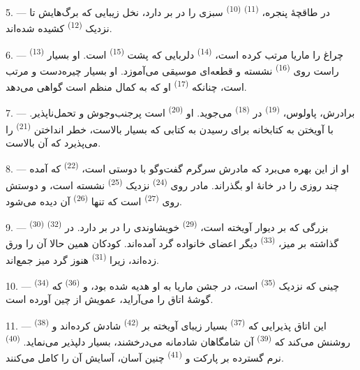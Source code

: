 5. --- در طاقچهٔ پنجره،  \textsuperscript{(11)}
 \textsuperscript{(10)} سبزی را در بر دارد، نخل زیبایی که
برگ‌هایش تا نزدیک  \textsuperscript{(12)} کشیده
شده‌اند.

6. ---  \textsuperscript{(13)} چراغ را ماریا مرتب کرده
است،  \textsuperscript{(14)} دلربایی که پشت
 \textsuperscript{(15)} است. او بسیار راست روی
 \textsuperscript{(16)} نشسته و قطعه‌ای موسیقی
می‌آموزد. او بسیار چیره‌دست و مرتب است، چنانکه 
\textsuperscript{(17)} او که به کمال منظم است گواهی می‌دهد.

\VUsaut{5.0mm}
\VUsaut{3.0mm}

7. --- برادرش، پاولوس،  \textsuperscript{(19)} در
 \textsuperscript{(18)} می‌جوید. او 
\textsuperscript{(20)} است پرجنب‌وجوش و تحمل‌ناپذیر. با آویختن به
کتابخانه برای رسیدن به کتابی که بسیار بالاست، خطر انداختن
 \textsuperscript{(21)} را می‌پذیرد که آن بالاست.

8. --- او از این بهره می‌برد که مادرش سرگرم گفت‌وگو با دوستی است،
 \textsuperscript{(22)} که آمده چند روزی را در خانهٔ او
بگذراند. مادر روی  \textsuperscript{(24)} نزدیک
 \textsuperscript{(25)} نشسته است، و دوستش روی
 \textsuperscript{(27)} است که تنها 
\textsuperscript{(26)} آن دیده می‌شود.

9. ---  \textsuperscript{(30)} بزرگی که بر دیوار آویخته
است،  \textsuperscript{(29)} خویشاوندی را در بر دارد. در
 \textsuperscript{(32)} گذاشته بر میز، 
\textsuperscript{(33)} دیگر اعضای خانواده گرد آمده‌اند. کودکان همین حالا
آن را ورق زده‌اند، زیرا  \textsuperscript{(31)} هنوز
گرد میز جمع‌اند.

10. ---  \textsuperscript{(34)} چینی که نزدیک
 \textsuperscript{(35)} است، در جشن ماریا به او هدیه
شده بود، و  \textsuperscript{(36)} که گوشهٔ اتاق را
می‌آراید، عمویش از چین آورده است.

11. --- این اتاق پذیرایی که  \textsuperscript{(37)}
بسیار زیبای آویخته بر  \textsuperscript{(42)} شادش
کرده‌اند و  \textsuperscript{(38)} روشنش می‌کند که
 \textsuperscript{(39)} آن شامگاهان شادمانه
می‌درخشند، بسیار دلپذیر می‌نماید.  \textsuperscript{(40)}
نرم گسترده بر پارکت و  \textsuperscript{(41)} چنین
آسان، آسایش آن را کامل می‌کنند.

